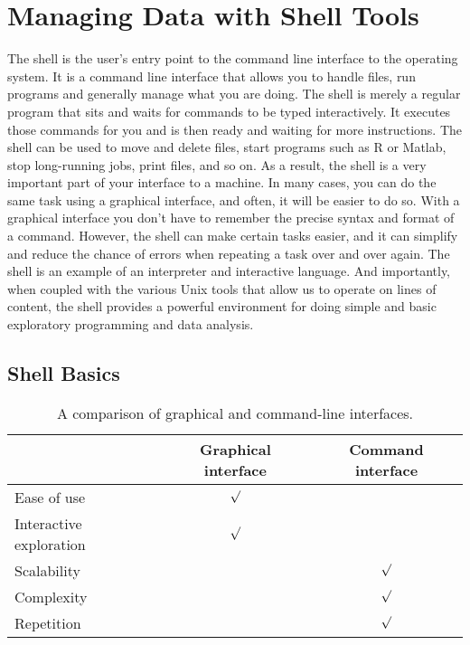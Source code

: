 \def\shellArg#1{\texttt{#1}}
\def\shellCmd#1{\texttt{#1}}
\def\shellKey#1{\textbf{#1}}
\def\Pattern#1{\textsl{#1}}
\def\Directory#1{\textbf{#1/}}
\def\Dir#1{\textbf{#1/}}
\def\Value#1{\texttt{#1}}
\def\envVar#1{\texttt{#1}}
\def\shellVar#1{\texttt{#1}}
\def\Shell#1{\exec{#1}}
\chapter{Managing Data with Shell Tools}\label{chap:shells}

The shell is the user's entry point to the command line interface to
the operating system.  It is a command line interface that allows you
to handle files, run programs and generally manage what you are doing.
The shell is merely a regular program that sits and waits for commands
to be typed interactively.  It executes those commands for you and is
then ready and waiting for more instructions.  The shell can be used
to move and delete files, start programs such as R or Matlab, stop
long-running jobs, print files, and so on.  As a result, the shell is
a very important part of your interface to a machine.  In many cases,
you can do the same task using a graphical interface, and often, it
will be easier to do so. With a graphical interface you don't have to
remember the precise syntax and format of a command.  However, the
shell can make certain tasks easier, and it can simplify and reduce
the chance of errors when repeating a task over and over again.  The
shell is an example of an interpreter and interactive language.  And
importantly, when coupled with the various Unix tools that allow us to
operate on lines of content, the shell provides a powerful environment
for doing simple and basic exploratory programming and data analysis.



\section{Shell Basics}


\begin{table}
\begin{center}
\begin{tabular}{lcc}
 & Graphical interface & Command interface \\ 
\hline
 Ease of use & $\surd$ & \\
 Interactive exploration & $\surd$ & \\
 Scalability & & $\surd$ \\
 Complexity & & $\surd$ \\
 Repetition & & $\surd$ \\
\end{tabular}
\caption{A comparison of graphical and command-line interfaces.} 
\end{center}
\end{table}


